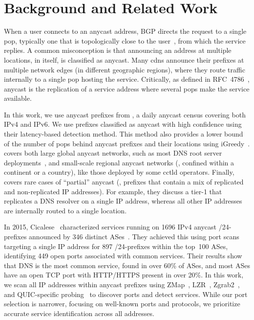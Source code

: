 
\section{Background and Related Work}
\label{sec:background-and-related-work}
When a user connects to an anycast address, BGP directs the request to a single \gls{pop},
typically one that is topologically close to the user~\cite{rfc4786}, from which the service replies.
%
A common misconception is that announcing an address at multiple locations, in itself, is classified as anycast.
Many \glspl{cdn} announce their prefixes at multiple network edges (in different geographic regions),
where they route traffic internally to a single \gls{pop} hosting the service.
Critically, as defined in RFC~4786~\cite{rfc4786},
anycast is the replication of a service address where several \glspl{pop} make the service available.

In this work, we use anycast prefixes from \laces, a daily anycast census covering both IPv4 and IPv6.
We use prefixes classified as anycast with high confidence using their latency-based detection method.
This method also provides a lower bound of the number of \glspl{pop} behind anycast prefixes and their locations using iGreedy~\cite{igreedy}.
\laces covers both large global anycast networks,
such as most DNS root server deployments~\cite{rootservers},
and small-scale regional anycast networks
(\eg, confined within a continent or a country),
like those deployed by some \gls{cctld} operators.
%
Finally, \laces covers rare cases of ``partial'' anycast (\ie, prefixes that contain a mix of replicated and non-replicated IP addresses).
For example, they discuss a tier-1 that replicates a DNS resolver on a single IP address, whereas all other IP addresses
are internally routed to a single location.

In 2015, Cicalese \etal~characterized services running on \num{1696} IPv4 anycast /24-prefixes
announced by \num{346} distinct ASes~\cite{CicaleseEtAl_CharacterizingIPv4Anycast_2015}.
They achieved this using  port scans targeting a single IP address for \num{897} /24-prefixes
within the top~100 ASes,
identifying \num{449} open ports associated with common services.
%
Their results show that DNS is the most common service, found in over 60\% of ASes,
and most ASes have an open TCP port with HTTP/HTTPS present in over 20\%.
%
In this work,
we scan all IP addresses within anycast prefixes
using ZMap~\cite{ZMapInternetScanner2013},
LZR~\cite{lzr}, Zgrab2~\cite{censys15}, 
and QUIC-specific probing~\cite{zirngibl2021over9000}
to discover ports and detect services.
%
While our port selection is narrower,
focusing on well-known ports and protocols,
we prioritize accurate service identification across all addresses.
%


